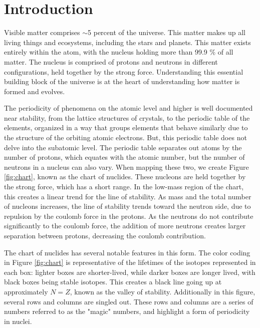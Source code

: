 %
%

\chapter{Introduction}

Visible matter comprises $\sim$5 percent of the universe. This matter makes up all living things and ecosystems, including the stars and planets. This matter exists entirely within the atom, with the nucleus holding more than 99.9 \% of all matter. The nucleus is comprised of protons and neutrons in different configurations, held together by the strong force. Understanding this essential building block of the universe is at the heart of understanding how matter is formed and evolves.

The periodicity of phenomena on the atomic level and higher is well documented near stability, from the lattice structures of crystals, to the periodic table of the elements, organized in a way that groups elements that behave similarly due to the structure of the orbiting atomic electrons. But, this periodic table does not delve into the subatomic level. The periodic table separates out atoms by the number of protons, which equates with the atomic number, but the number of neutrons in a nucleus can also vary. When mapping these two, we create Figure \ref{fig:chart}, known as the chart of nuclides. These nucleons are held together by the strong force, which has a short range. In the low-mass region of the chart, this creates a linear trend for the line of stability. As mass and the total number of nucleons increases, the line of stability trends toward the neutron side, due to repulsion by the coulomb force in the protons. As the neutrons do not contribute significantly to the coulomb force, the addition of more neutrons creates larger separation between protons, decreasing the coulomb contribution.



The chart of nuclides has several notable features in this form. The color coding in Figure \ref{fig:chart} is representative of the lifetimes of the isotopes represented in each box: lighter boxes are shorter-lived, while darker boxes are longer lived, with black boxes being stable isotopes. This creates a black line going up at approximately $N=Z$, known as the valley of stability. Additionally in this figure, several rows and columns are singled out. These rows and columns are a series of numbers referred to as the "magic" numbers, and highlight a form of periodicity in nuclei. 

